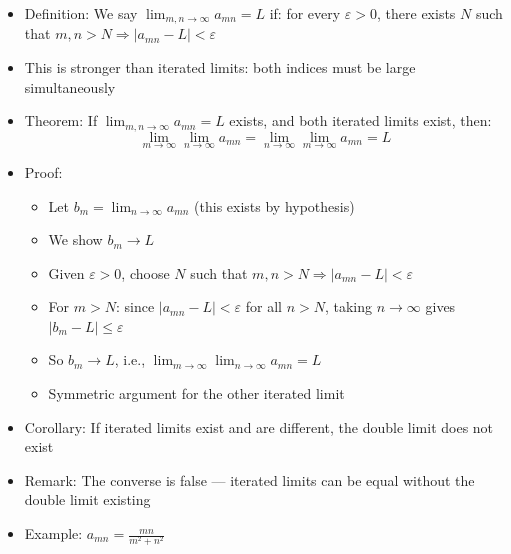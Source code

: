 \documentclass[
  10pt,
  letterpaper,
]{scrbook}
\providecommand{\tightlist}{%
  \setlength{\itemsep}{0pt}\setlength{\parskip}{0pt}}
\begin{document}
\begin{itemize}
\tightlist
\item
  Definition: We say \(\lim_{m,n \to \infty} a_{mn} = L\) if: for every
  \(\varepsilon > 0\), there exists \(N\) such that
  \(m, n > N \Rightarrow |a_{mn} - L| < \varepsilon\)
\item
  This is stronger than iterated limits: both indices must be large
  simultaneously
\item
  Theorem: If \(\lim_{m,n \to \infty} a_{mn} = L\) exists, and both
  iterated limits exist, then:
  \[\lim_{m \to \infty} \lim_{n \to \infty} a_{mn} = \lim_{n \to \infty} \lim_{m \to \infty} a_{mn} = L\]
\item
  Proof:

  \begin{itemize}
  \tightlist
  \item
    Let \(b_m = \lim_{n \to \infty} a_{mn}\) (this exists by hypothesis)
  \item
    We show \(b_m \to L\)
  \item
    Given \(\varepsilon > 0\), choose \(N\) such that
    \(m, n > N \Rightarrow |a_{mn} - L| < \varepsilon\)
  \item
    For \(m > N\): since \(|a_{mn} - L| < \varepsilon\) for all
    \(n > N\), taking \(n \to \infty\) gives
    \(|b_m - L| \leq \varepsilon\)
  \item
    So \(b_m \to L\), i.e.,
    \(\lim_{m \to \infty} \lim_{n \to \infty} a_{mn} = L\)
  \item
    Symmetric argument for the other iterated limit
  \end{itemize}
\item
  Corollary: If iterated limits exist and are different, the double
  limit does not exist
\item
  Remark: The converse is false --- iterated limits can be equal without
  the double limit existing
\item
  Example: \(a_{mn} = \frac{mn}{m^2 + n^2}\)


\end{itemize}
\end{document}
